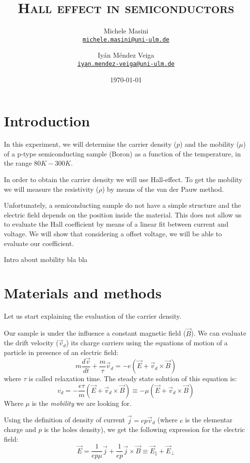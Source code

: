 \documentclass[11pt,a4paper]{article}
\title{\bfseries\textsc{Hall effect in semiconductors}}
\author{
Michele Masini\\ \small\texttt{\href{mailto:michele.masini@uni-ulm.de}{michele.masini@uni-ulm.de}}\and
Iyán Méndez Veiga\\ \small\texttt{\href{mailto:iyan.mendez-veiga@uni-ulm.de}{iyan.mendez-veiga@uni-ulm.de}}
}
\date{\today}
\begin{document}
\maketitle



\section{Introduction}
In this experiment, we will determine the carrier density ($p$) and the mobility ($\mu$) of a p-type semiconducting sample (Boron) as a function of the temperature, in the range $80K-300K$.

In order to obtain the carrier density we will use Hall-effect. To get the mobility we will measure the resistivity ($\rho$) by means of the van der Pauw method. 

Unfortunately, a semiconducting sample do not have a simple structure and the electric field depends on the position inside the material. This does not allow us to evaluate the Hall coefficient by means of a linear fit between current and voltage. We will show that considering a offset voltage, we will be able to evaluate our coefficient.

Intro about mobility bla bla

\section{Materials and methods}
Let us start explaining the evaluation of the carrier density.

Our sample is under the influence a constant magnetic field ($\vec{B}$). We can evaluate the drift velocity ($\vec{v}_d$) its charge carriers using the equations of motion of a particle in presence of an electric field:
\begin{equation*}
m\frac{d\vec{v}}{dt}+\frac{m}{\tau}\vec{v}_d=-e(\vec{E}+\vec{v}_d\times\vec{B})
\end{equation*} where $\tau$ is called relaxation time. The steady state solution of this equation is: 
\begin{equation}
v_d=-\frac{e\tau}{m}(\vec{E}+\vec{v}_d\times\vec{B})\equiv -\mu (\vec{E}+\vec{v}_d\times\vec{B})
\end{equation}Where $\mu$ is the \emph{mobility} we are looking for. %

Using the definition of density of current $\vec{j}=ep\vec{v}_d$ (where $e$ is the elementar charge and $p$ is the holes density), we get the following expression for the electric field:
\begin{equation}
\vec{E}=\frac{1}{ep\mu}\vec{j}+\frac{1}{ep}\vec{j}\times\vec{B}\equiv \vec{E}_\parallel+\vec{E}_\perp
\end{equation}
\end{document}
